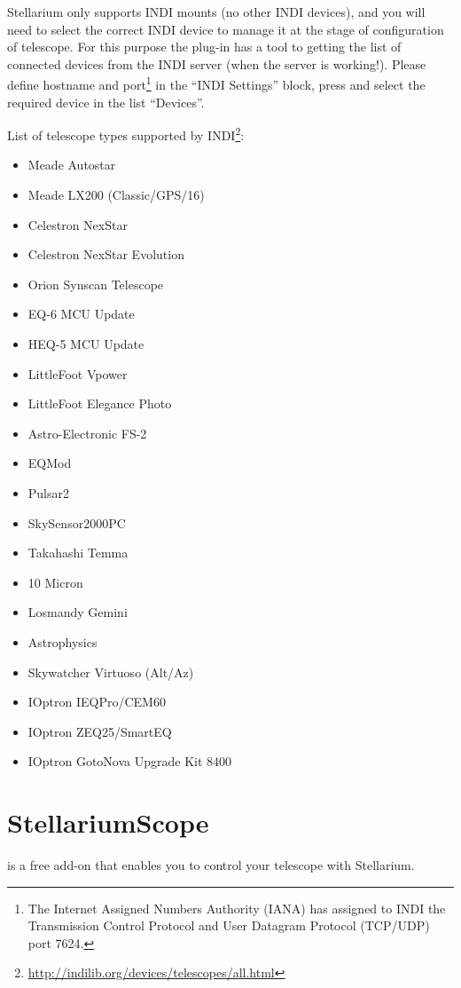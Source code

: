 Stellarium only supports INDI mounts (no other INDI devices), and you will need to select the correct INDI device 
to manage it at the stage of configuration of telescope. 
For this purpose the plug-in has a tool to getting the list of connected devices from the INDI server (when the server is working!). 
Please define hostname and port\footnote{The Internet Assigned Numbers Authority (IANA) has assigned to INDI 
the Transmission Control Protocol and User Datagram Protocol (TCP/UDP) port 7624.} 
in the ``INDI Settings'' block, press  and select the required device in the list ``Devices''. 

List of telescope types supported by INDI\footnote{\url{http://indilib.org/devices/telescopes/all.html}}:
\begin{itemize}
\item Meade Autostar
\item Meade LX200 (Classic/GPS/16)
\item Celestron NexStar
\item Celestron NexStar Evolution
\item Orion Synscan Telescope
\item EQ-6 MCU Update
\item HEQ-5 MCU Update
\item LittleFoot Vpower
\item LittleFoot Elegance Photo
\item Astro-Electronic FS-2
\item EQMod
\item Pulsar2
\item SkySensor2000PC
\item Takahashi Temma
\item 10 Micron
\item Losmandy Gemini
\item Astrophysics
\item Skywatcher Virtuoso (Alt/Az)
\item IOptron IEQPro/CEM60
\item IOptron ZEQ25/SmartEQ
\item IOptron GotoNova Upgrade Kit 8400
\end{itemize}

\section{StellariumScope}
\label{sec:plugins:StellariumScope}
 is a free add-on that enables you to control your telescope with Stellarium. 

